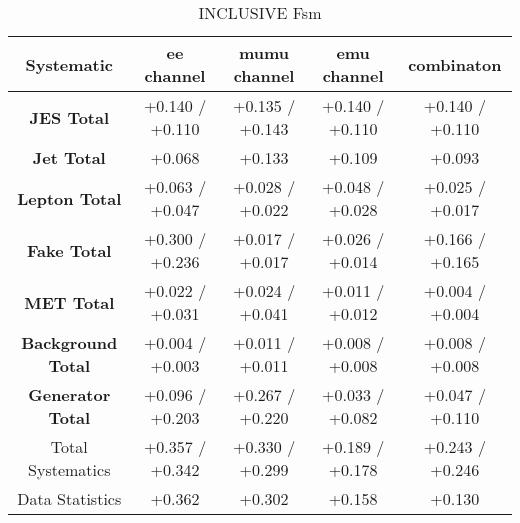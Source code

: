     \begin{table}[htbp]
\scriptsize
  \begin{center} 
  \begin{tabular}{|c|c|c|c|c|}
  \hline
   Systematic                            &  ee channel&  mumu channel&  emu channel&  combinaton\\
 \hline
\textbf{JES Total}                    &+0.140   / +0.110   & +0.135   / +0.143   & +0.140   / +0.110   & +0.140   / +0.110  \\
\textbf{Jet Total}                    &+0.068              & +0.133              & +0.109              & +0.093             \\
\textbf{Lepton Total}                 &+0.063   / +0.047   & +0.028   / +0.022   & +0.048   / +0.028   & +0.025   / +0.017  \\
\textbf{Fake Total}                   &+0.300   / +0.236   & +0.017   / +0.017   & +0.026   / +0.014   & +0.166   / +0.165  \\
\textbf{MET Total}                    &+0.022   / +0.031   & +0.024   / +0.041   & +0.011   / +0.012   & +0.004   / +0.004  \\
\textbf{Background Total}             &+0.004   / +0.003   & +0.011   / +0.011   & +0.008   / +0.008   & +0.008   / +0.008  \\
\textbf{Generator Total}              &+0.096   / +0.203   & +0.267   / +0.220   & +0.033   / +0.082   & +0.047   / +0.110  \\
  \hline
  \hline
Total Systematics                     &+0.357   / +0.342   & +0.330   / +0.299   & +0.189   / +0.178   & +0.243   / +0.246  \\
Data Statistics                       &+0.362              & +0.302              & +0.158              & +0.130             \\
  \hline
  \end{tabular}
  \end{center} 
  \label{tab:fsm_nominal_coscos_op}
  \caption{\coscosop INCLUSIVE Fsm}
\end{table}

